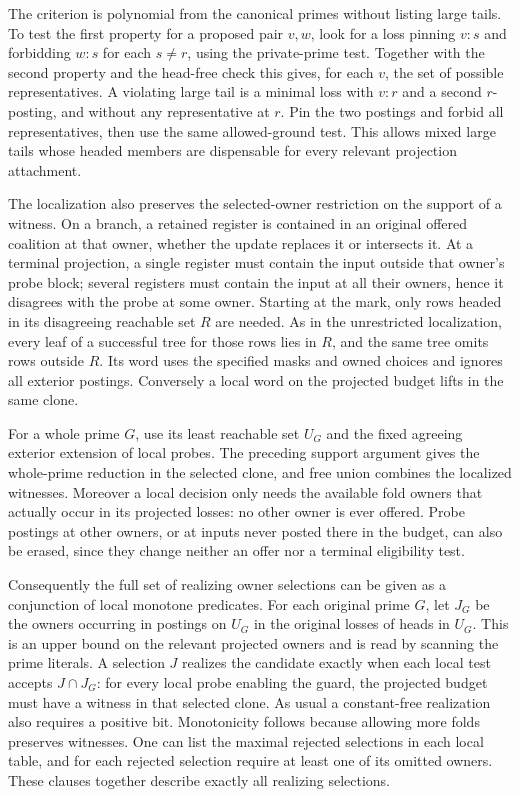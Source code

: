 The criterion is polynomial from the canonical
primes without listing large tails. To test the
first property for a proposed pair $v,w$, look
for a loss pinning $v:s$ and forbidding $w:s$
for each $s\ne r$, using the private-prime
test. Together with the second property and
the head-free check this gives, for each $v$,
the set of possible representatives. A
violating large tail is a minimal loss with
$v:r$ and a second $r$-posting, and without
any representative at $r$. Pin the two
postings and forbid all representatives, then
use the same allowed-ground test. This
allows mixed large tails whose headed
members are dispensable for every relevant
projection attachment.

The localization also preserves the selected-owner
restriction on the support of a witness. On a branch,
a retained register is contained in an original
offered coalition at that owner, whether the update
replaces it or intersects it. At a terminal projection,
a single register must contain the input outside that
owner's probe block; several registers must contain
the input at all their owners, hence it disagrees
with the probe at some owner. Starting at the mark,
only rows headed in its disagreeing reachable set
$R$ are needed. As in the unrestricted localization,
every leaf of a successful tree for those rows lies
in $R$, and the same tree omits rows outside $R$.
Its word uses the specified masks and owned choices
and ignores all exterior postings. Conversely a local
word on the projected budget lifts in the same clone.

For a whole prime $G$, use its least reachable set
$U_G$ and the fixed agreeing exterior extension of
local probes. The preceding support argument gives
the whole-prime reduction in the selected clone,
and free union combines the localized witnesses.
Moreover a local decision only needs the available
fold owners that actually occur in its projected
losses: no other owner is ever offered. Probe
postings at other owners, or at inputs never posted
there in the budget, can also be erased, since they
change neither an offer nor a terminal eligibility
test.

Consequently the full set of realizing owner
selections can be given as a conjunction of local
monotone predicates. For each original prime $G$,
let $J_G$ be the owners occurring in postings on
$U_G$ in the original losses of heads in $U_G$.
This is an upper bound on the relevant projected
owners and is read by scanning the prime literals.
A selection $J$ realizes the candidate exactly when
each local test accepts $J\cap J_G$: for every local
probe enabling the guard, the projected budget must
have a witness in that selected clone. As usual a
constant-free realization also requires a positive
bit. Monotonicity follows because allowing more
folds preserves witnesses. One can list the
maximal rejected selections in each local table,
and for each rejected selection require at least
one of its omitted owners. These clauses together
describe exactly all realizing selections.

